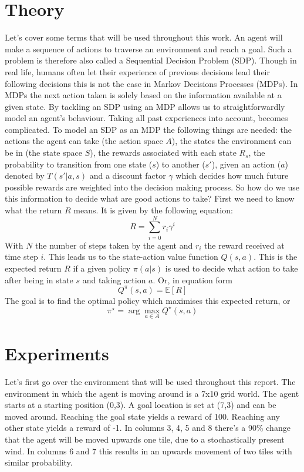 \documentclass{article}
\theoremstyle{plain}
\theoremstyle{definition}
\theoremstyle{remark}
\begin{document}
\section{Theory}\label{sec:theory}
Let's cover some terms that will be used throughout this work. An agent will make a sequence of actions to traverse an environment and reach a goal. Such a problem is therefore also called a Sequential Decision Problem (SDP). Though in real life, humans often let their experience of previous decisions lead their following decisions this is not the case in Markov Decisions Processes (MDPs). In MDPs the next action taken is solely based on the information available at a given state. By tackling an SDP using an MDP allows us to straightforwardly model an agent's behaviour. Taking all past experiences into account, becomes complicated. To model an SDP as an MDP the following things are needed: the actions the agent can take (the action space $A$), the states the environment can be in (the state space $S$), the rewards associated with each state $R_s$, the probability to transition from one state ($s$) to another ($s'$), given an action ($a$) denoted by $T(s'|a,s)$ and a discount factor $\gamma$ which decides how much future possible rewards are weighted into the decision making process. So how do we use this information to decide what are good actions to take? First we need to know what the return $R$ means. It is given by the following equation:
\begin{equation}
    R = \sum_{i=0}^N r_i \gamma^i
    \label{eq:return}
\end{equation}
With $N$ the number of steps taken by the agent and $r_i$ the reward received at time step $i$. This leads us to the state-action value function $Q(s,a)$. This is the expected return $R$ if a given policy $\pi(a|s)$ is used to decide what action to take after being in state $s$ and taking action $a$. Or, in equation form
\begin{equation}
    Q^\pi(s,a) = \mathds{E}\left[R\right]
    \label{eq:state_action_value}
\end{equation}
The goal is to find the optimal policy which maximises this expected return, or
\begin{equation}
    \pi^\star = \arg\max_{a\in A} Q^\star(s,a)
    \label{eq:RL_goal}
\end{equation}



\section{Experiments}\label{sec:experiments} %
Let's first go over the environment that will be used throughout this report. The environment in which the agent is moving around is a 7x10 grid world. The agent starts at a starting position (0,3). A goal location is set at (7,3) and can be moved around. Reaching the goal state yields a reward of 100. Reaching any other state yields a reward of -1. In columns 3, 4, 5 and 8 there's a 90\% change that the agent will be moved upwards one tile, due to a stochastically present wind. In columns 6 and 7 this results in an upwards movement of two tiles with similar probability.
\end{document}
